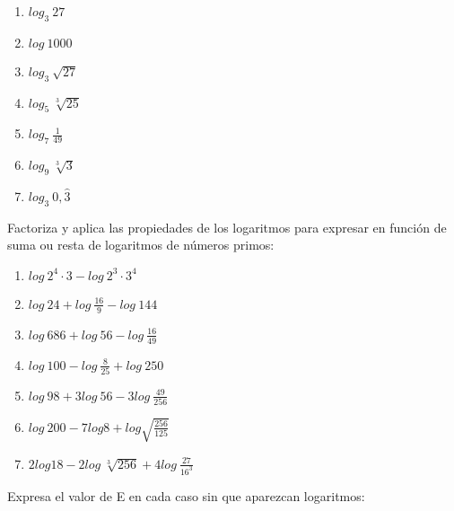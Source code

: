 \begin{enumerate}[topsep=0pt]

	\item $log_3~27 $
	\item $log~1000 $
	\item $log_3~\sqrt{27}$
	\item $log_5~\sqrt[3]{25} $

	\item $log_7~\frac{1}{49} $

	\item $log_9~\sqrt[3]{3} $

	\item $log_3~0,\widehat{3} $

\end{enumerate}



\Exercicio Factoriza y aplica las propiedades de los logaritmos para expresar en función de suma ou resta de logaritmos de números primos:

\begin{enumerate}[topsep=0pt]

	\item $log~2^4 \cdot 3 - log~2^3 \cdot 3^4 $

	\item $log~24 + log~\frac{16}{9} - log~144 $

	\item $log~686 + log~56 - log~\frac{16}{49} $

	\item $log~100 - log~\frac{8}{25} + log~250 $
	
	\item $log~98 + 3 log~56 - 3 log~\frac{49}{256}$
	
	\item $log~200 - 7 log 8 + log \sqrt{\frac{256}{125}}$
	
	\item $2 log 18 - 2 log~\sqrt[3]{256} + 4 log~\frac{27}{16^3}$

\end{enumerate}



\Exercicio Expresa el valor de E en cada caso sin que aparezcan logaritmos:

